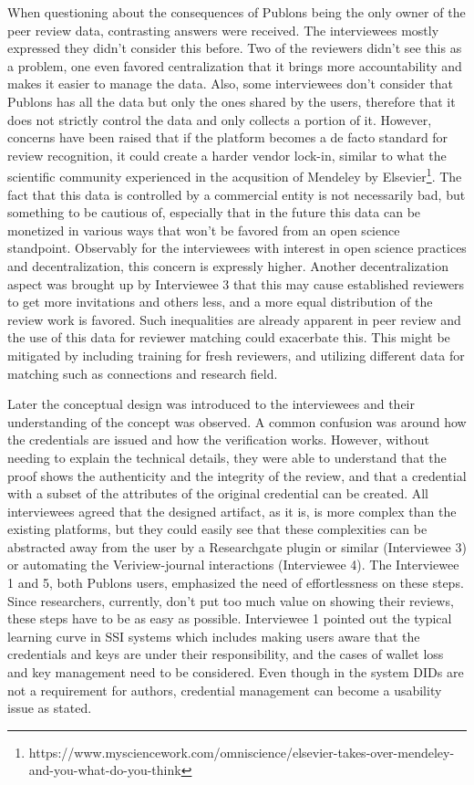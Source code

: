 When questioning about the consequences of Publons being the only owner of the peer review data, contrasting answers were received. The interviewees mostly expressed they didn't consider this before. Two of the reviewers didn't see this as a problem, one even favored centralization that it brings more accountability and makes it easier to manage the data. Also, some interviewees don't consider that Publons has all the data but only the ones shared by the users, therefore that it does not strictly control the data and only collects a portion of it. However, concerns have been raised that if the platform becomes a de facto standard for review recognition, it could create a harder vendor lock-in, similar to what the scientific community experienced in the acqusition of Mendeley by Elsevier\footnote{https://www.mysciencework.com/omniscience/elsevier-takes-over-mendeley-and-you-what-do-you-think}. The fact that this data is controlled by a commercial entity is not necessarily bad, but something to be cautious of, especially that in the future this data can be monetized in various ways that won't be favored from an open science standpoint. Observably for the interviewees with interest in open science practices and decentralization, this concern is expressly higher. Another decentralization aspect was brought up by Interviewee 3 that this may cause established reviewers to get more invitations and others less, and a more equal distribution of the review work is favored. Such inequalities are already apparent in peer review \parencite{Warne.2016, Publons.2018,Ware.2008, Hochberg.2009} and the use of this data for reviewer matching could exacerbate this. This might be mitigated by including training for fresh reviewers, and utilizing different data for matching such as connections and research field. 

Later the conceptual design was introduced to the interviewees and their understanding of the concept was observed. A common confusion was around how the credentials are issued and how the verification works. However, without needing to explain the technical details, they were able to understand that the proof shows the authenticity and the integrity of the review, and that a credential with a subset of the attributes of the original credential can be created. All interviewees agreed that the designed artifact, as it is, is more complex than the existing platforms, but they could easily see that these complexities can be abstracted away from the user by a Researchgate plugin or similar (Interviewee 3) or automating the Veriview-journal interactions (Interviewee 4). The Interviewee 1 and 5, both Publons users, emphasized the need of effortlessness on these steps. Since researchers, currently, don't put too much value on showing their reviews, these steps have to be as easy as possible. Interviewee 1 pointed out the typical learning curve in \acrshort{SSI} systems which includes making users aware that the credentials and keys are under their responsibility, and the cases of wallet loss and key management need to be considered. Even though in the system \acrshort{DID}s are not a requirement for authors, credential management can become a usability issue as stated. 

